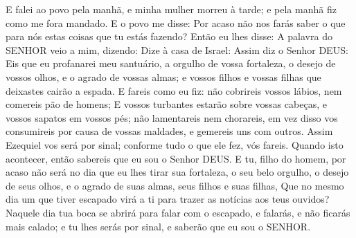 {E falei ao povo pela manhã, e minha mulher morreu à tarde; e pela manhã fiz como me fora mandado.
E o povo me disse: Por acaso não nos farás saber o que
{} para nós estas coisas que tu estás fazendo?
Então eu lhes disse: A palavra do SENHOR veio a mim, dizendo:
Dize à casa de Israel: Assim diz o Senhor DEUS: Eis que eu profanarei meu santuário, a orgulho de vossa fortaleza, o desejo de vossos olhos, e o agrado de vossas almas; e vossos filhos e vossas filhas que deixastes cairão a espada.
E fareis como eu fiz: não cobrireis vossos lábios, nem comereis pão de homens;
E vossos turbantes estarão sobre vossas cabeças, e vossos sapatos em vossos pés; não lamentareis nem chorareis, em vez disso vos consumireis por causa de vossas maldades, e gemereis uns com outros.
Assim Ezequiel vos será por sinal; conforme tudo o que ele fez, vós fareis. Quando isto acontecer, então sabereis que eu sou o Senhor DEUS.
E tu, filho do homem, por acaso não será no dia que eu lhes tirar sua fortaleza, o seu belo orgulho, o desejo de seus olhos, e o agrado de suas almas, seus filhos e suas filhas,
Que no mesmo dia um que tiver escapado virá a ti para trazer as notícias aos teus ouvidos?
Naquele dia tua boca se abrirá para falar com o escapado, e falarás, e não ficarás mais calado; e tu lhes serás por sinal, e saberão que eu sou o SENHOR.

}
